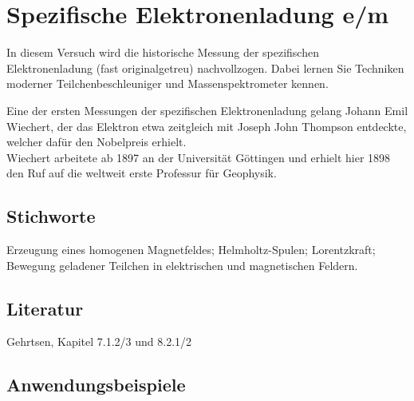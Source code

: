 \chapter{Spezifische Elektronenladung e/m}
\label{v:20}

In diesem Versuch wird die historische Messung der spezifischen Elektronenladung (fast originalgetreu) nachvollzogen. Dabei lernen Sie Techniken moderner Teilchenbeschleuniger und Massenspektrometer kennen.

\begin{hint}
Eine der ersten Messungen der spezifischen Elektronenladung gelang Johann Emil Wiechert, der das Elektron etwa zeitgleich mit Joseph John Thompson entdeckte, welcher dafür den Nobelpreis erhielt.\\ 
Wiechert arbeitete ab 1897 an der Universität Göttingen und erhielt hier 1898 den Ruf auf die weltweit erste Professur für Geophysik.
\end{hint}

\section{Stichworte}

Erzeugung eines homogenen Magnetfeldes; Helmholtz-Spulen; Lorentzkraft; Bewegung geladener Teilchen in elektrischen und magnetischen Feldern.
%
\section{Literatur}

Gehrtsen, Kapitel 7.1.2/3 und 8.2.1/2
%
\section{Anwendungsbeispiele}

